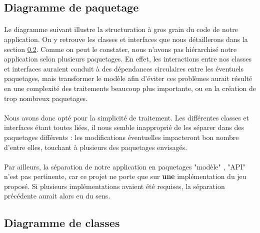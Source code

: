 \documentclass[a4paper]{article}
\begin{document}
\subsection{Diagramme de paquetage}
\paragraph{}
Le diagramme suivant illustre la structuration à gros grain du code de notre application. On y retrouve les classes et interfaces que nous détaillerons dans la section \ref{DDC}.
Comme on peut le constater, nous n'avons pas hiérarchisé notre application selon plusieurs paquetages. En effet, les interactions entre nos classes et interfaces auraient conduit à des dépendances circulaires entre les éventuels paquetages, mais transformer le modèle afin d'éviter ces problèmes aurait résulté en une complexité des traitements beaucoup plus importante, ou en la création de trop nombreux paquetages.

\paragraph{}
Nous avons donc opté pour la simplicité de traitement. Les différentes classes et interfaces étant toutes liées, il nous semble inapproprié de les séparer dans des paquetages différents : les modifications éventuelles impacteront bon nombre d'entre elles, touchant à plusieurs des paquetages envisagés.

\paragraph{}
Par ailleurs, la séparation de notre application en paquetages "modèle" , "API" n'est pas pertinente, car ce projet ne porte que sur \textbf{une} implémentation du jeu proposé. Si plusieurs implémentations avaient été requises, la séparation précédente aurait alors eu du sens.



\subsection{Diagramme de classes}
\label{DDC}
\end{document}
